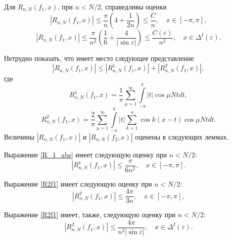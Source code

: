 \begin{lemma} \label{th_abs_1}
	Для $R_{n,N}(f_1,x)$, при $n < N/2$, справедливы оценки
	\begin{equation*}
		|R_{n,N}(f_1,x)| \leq \frac{\pi}{n}\left(4+\frac{1}{2n}\right) \leq \frac{C}{n}, \quad x \in [-\pi, \pi],
	\end{equation*}
	\begin{equation*}
		|R_{n,N}(f_1,x)| \leq \frac{\pi}{n^2} \left(\frac{1}{6}+\frac{4}{|\sin \varepsilon|}\right) \leq \frac{C(\varepsilon)}{n^2}, \quad x \in \Delta^I(\varepsilon).
	\end{equation*}
\end{lemma}
Нетрудно показать, что имеет место следующее представление
\begin{equation} \label{R=R1+R2}
	\left|R_{n,N}(f_1,x)\right| \leq \left|R^1_{n,N}(f_1,x)\right| + \left|R^2_{n,N}(f_1,x)\right|,
\end{equation}
где
\begin{equation}\label{R_1_abs}
	R^1_{n,N}(f_1,x) = \frac{1}{\pi} \sum\limits_{\mu=1}^{\infty} \int\limits_{-\pi}^{\pi} |t| \cos \mu N t dt,
\end{equation}
\begin{equation}\label{R2f1}
	R^2_{n,N}(f_1,x) = \frac{2}{\pi} \sum\limits_{\mu=1}^{\infty} \int\limits_{-\pi}^{\pi} |t| \sum\limits_{k=1}^{n} \cos k (x-t) \cos \mu N t dt.
\end{equation}
Величины $\left|R_{n,N}(f_1,x)\right| $ и $\left|R_{n,N}(f_2,x)\right| $ оценены в следующих леммах.
\begin{lemma} \label{lm1}
	Выражение \eqref{R_1_abs} имеет следующую оценку при $n < N/2$:
	\begin{equation*}
		|R^1_{n,N}(f_1,x)| \leq \frac{\pi}{6n^2}, \quad x \in [-\pi,\pi].
	\end{equation*}
\end{lemma}
\begin{lemma} \label{lm3}
	Выражение \eqref{R2f1}	имеет следующую оценку при $n < N/2$:
	\begin{equation*}
		|R^2_{n,N}(f_1,x)| \leq \frac{4\pi}{3n}, \quad x \in [-\pi, \pi],
	\end{equation*}
\end{lemma}
\begin{lemma} \label{lm2}
	Выражение \eqref{R2f1} имеет, также, следующую оценку при $n < N/2$:
	\begin{equation*}
		|R^2_{n,N}(f_1,x)| \leq \frac{4\pi}{n^2|\sin \varepsilon|}, \quad x \in \Delta^I(\varepsilon).
	\end{equation*}
\end{lemma}

